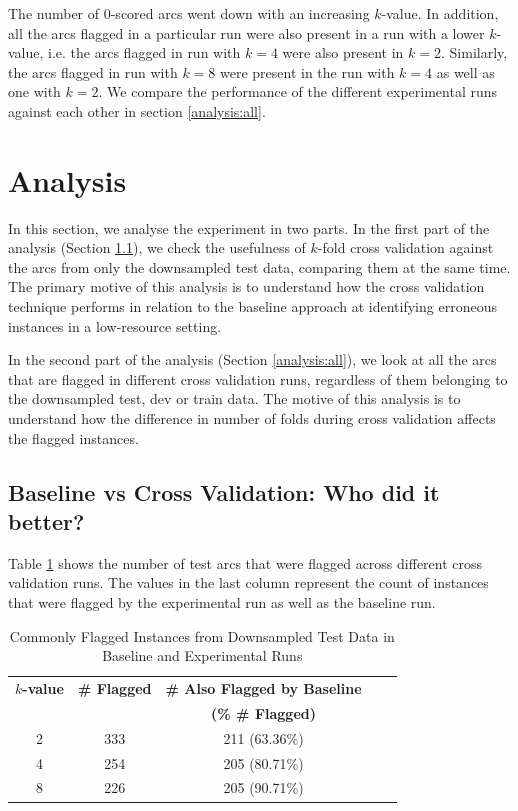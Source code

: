 The number of 0-scored arcs went down with an increasing $k$-value. In addition, all the arcs flagged in a particular run were also present in a run with a lower $k$-value, i.e. the arcs flagged in run with $k=4$ were also present in $k=2$. Similarly, the arcs flagged in run with $k=8$ were present in the run with $k=4$ as well as one with $k=2$. We compare the performance of the different experimental runs against each other in section \ref{analysis:all}.

\section{Analysis}
\label{compare:lisca}

In this section, we analyse the experiment in two parts. In the first part of the analysis (Section \ref{analysis:test}), we check the usefulness of $k$-fold cross validation against the arcs from only the downsampled test data, comparing them at the same time. The primary motive of this analysis is to understand how the cross validation technique performs in relation to the baseline approach at identifying erroneous instances in a low-resource setting.

In the second part of the analysis (Section \ref{analysis:all}), we look at all the arcs that are flagged in different cross validation runs, regardless of them belonging to the downsampled test, dev or train data. The motive of this analysis is to understand how the difference in number of folds during cross validation affects the flagged instances.

\subsection{Baseline vs Cross Validation: Who did it better?}
\label{analysis:test}

Table \ref{tab:test_lisca} shows the number of test arcs that were flagged across different cross validation runs. The values in the last column represent the count of instances that were flagged by the experimental run as well as the baseline run. 

\begin{table}[H]
    \centering
    \begin{tabular}{|c||c|c|c|c|}
    \hline
    \multicolumn{1}{|c||}{\textbf{$k$-value}} &
    \multicolumn{1}{c|}{\textbf{\# Flagged}} &
    \multicolumn{1}{c|}{\textbf{\# Also Flagged by Baseline}}\\
     & & \textbf{(\% \# Flagged)}\\
    \hline
    2 & 333 & 211 (63.36\%) \\
    4 & 254 & 205 (80.71\%) \\
    8 & 226 & 205 (90.71\%) \\
    \hline
    \end{tabular}
    \caption{Commonly Flagged Instances from Downsampled Test Data in Baseline and Experimental Runs}
    \label{tab:test_lisca}
\end{table}


